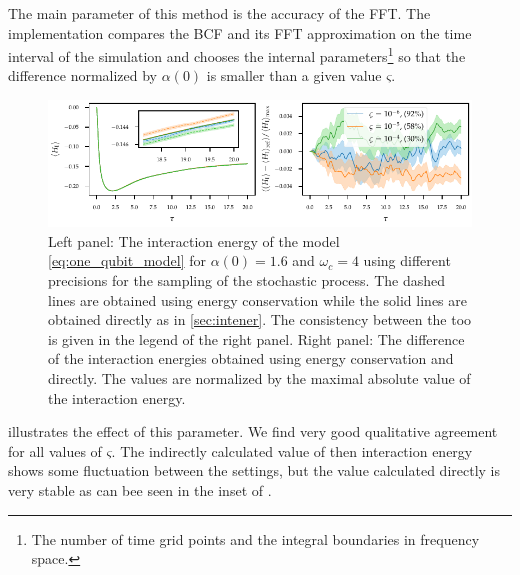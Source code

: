 The main parameter of this method is the accuracy of the FFT. The
implementation compares the BCF and its FFT approximation on the time
interval of the simulation and chooses the internal
parameters\footnote{The number of time grid points and the integral
  boundaries in frequency space.} so that the difference normalized by
\(α(0)\) is smaller than a given value \(ς\).

\begin{figure}[h]
  \centering
  \includegraphics{figs/one_bath_syst/stocproc_systematics_interaction}
  \caption{\label{fig:stocproc_systematics} Left panel: The
    interaction energy of the model \cref{eq:one_qubit_model} for
    \(α(0)=1.6\) and \(ω_c=4\) using different precisions for the
    sampling of the stochastic process. The dashed lines are obtained
    using energy conservation while the solid lines are obtained
    directly as in \cref{sec:intener}. The consistency between the too
    is given in the legend of the right panel. Right panel: The
    difference of the interaction energies obtained using energy
    conservation and directly. The values are normalized by the
    maximal absolute value of the interaction energy.}
\end{figure}
 illustrates the effect of this
parameter. We find very good qualitative agreement for all values of
\(ς\). The indirectly calculated value of then interaction energy
shows some fluctuation between the settings, but the value calculated
directly is very stable as can bee seen in the inset of
.

